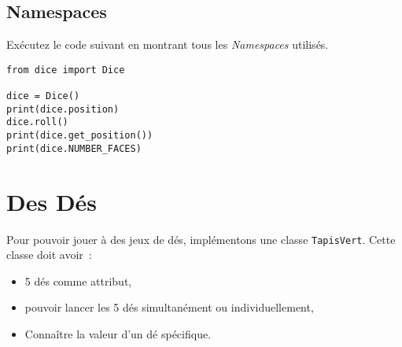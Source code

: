 \documentclass[12pt]{article}
\begin{document}
\subsection{Namespaces}

Exécutez le code suivant en montrant tous les {\em Namespaces} utilisés.

\lstset{language=Python}
\begin{lstlisting}
from dice import Dice

dice = Dice()
print(dice.position)
dice.roll()
print(dice.get_position())
print(dice.NUMBER_FACES)
\end{lstlisting}

\section{Des Dés}

Pour pouvoir jouer à des jeux de dés, implémentons une classe \verb|TapisVert|. Cette classe doit avoir~:
\begin{itemize}
	\item 5 dés comme attribut,
	\item pouvoir lancer les 5 dés simultanément ou individuellement,
	\item Connaître la valeur d'un dé spécifique.
\end{itemize}
\end{document}
